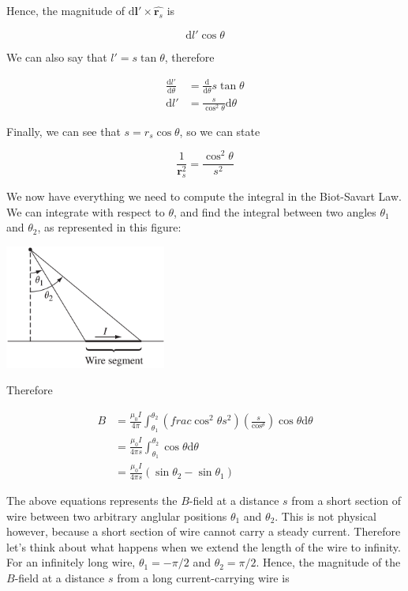 \documentclass[
  letterpaper,
  DIV=11,
  numbers=noendperiod]{scrreprt}
\begin{document}
Hence, the magnitude of
\(\mathrm{d} \mathrm{\mathbf{l}}' \times \hat{\mathrm{\mathbf{r}}_s}\)
is

\[ \mathrm{d} l' \cos\theta \]

We can also say that \(l' = s \tan\theta\), therefore

\[ \begin{split} 
\frac{\mathrm{d} l'}{\mathrm{d} \theta} &=  \frac{\mathrm{d} }{\mathrm{d} \theta} s \tan\theta \\
\mathrm{d}l' &=  \frac{s}{ \cos^2 \theta} \mathrm{d}\theta
\end{split}
\]

Finally, we can see that \(s = r_s \cos \theta\), so we can state

\[ \frac{1}{\mathrm{\mathbf{r}}_s^2} = \frac{\cos^2 \theta}{s^2} \]

We now have everything we need to compute the integral in the
Biot-Savart Law. We can integrate with respect to \(\theta\), and find
the integral between two angles \(\theta_1\) and \(\theta_2\), as
represented in this figure:

\includegraphics[width=2.08333in,height=\textheight]{Figures/BS-example-2.png}

Therefore

\[ \begin{split} 
B &= \frac{\mu_0 I}{4 \pi} \int_{\theta_1}^{\theta_2} \left( frac{\cos^2 \theta }{s^2} \right) \left( \frac{s}{\cos^\theta} \right) \cos\theta \mathrm{d}\theta   \\
 &= \frac{\mu_0 I}{4 \pi s} \int_{\theta_1}^{\theta_2}  \cos\theta \mathrm{d}\theta \\
 &= \frac{\mu_0 I}{4 \pi s} (\sin\theta_2 - \sin \theta_1) 
\end{split}
\]

The above equations represents the \(B\)-field at a distance \(s\) from
a short section of wire between two arbitrary anglular positions
\(\theta_1\) and \(\theta_2\). This is not physical however, because a
short section of wire cannot carry a steady current. Therefore let's
think about what happens when we extend the length of the wire to
infinity. For an infinitely long wire, \(\theta_1 = -\pi/2\) and
\(\theta_2 = \pi/2\). Hence, the magnitude of the \(B\)-field at a
distance \(s\) from a long current-carrying wire is
\end{document}
